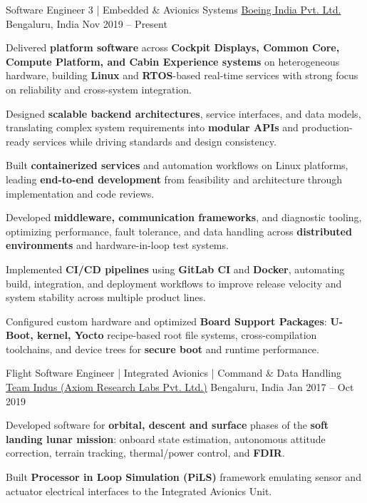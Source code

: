 \begin{cventries}
	\cventry
	{Software Engineer 3 | Embedded \& Avionics Systems}
	{\href{https://www.boeing.co.in/}{Boeing India Pvt. Ltd.}}
	{Bengaluru, India}
	{Nov 2019 -- Present}
	{
		\begin{cvitems}
		\item{Delivered \textbf{platform software} across \textbf{Cockpit Displays, Common Core, Compute Platform, and Cabin Experience systems} on heterogeneous hardware, building \textbf{Linux} and \textbf{RTOS}-based real-time services with strong focus on reliability and cross-system integration.}
		\vspace{8pt}
		\item{Designed \textbf{scalable backend architectures}, service interfaces, and data models, translating complex system requirements into \textbf{modular APIs} and production-ready services while driving standards and design consistency.}
		\vspace{8pt}
		\item{Built \textbf{containerized services} and automation workflows on Linux platforms, leading \textbf{end-to-end development} from feasibility and architecture through implementation and code reviews.}
		\vspace{8pt}
		\item{Developed \textbf{middleware, communication frameworks}, and diagnostic tooling, optimizing performance, fault tolerance, and data handling across \textbf{distributed environments} and hardware-in-loop test systems.}
		\vspace{8pt}
		\item{Implemented \textbf{CI/CD pipelines} using \textbf{GitLab CI} and \textbf{Docker}, automating build, integration, and deployment workflows to improve release velocity and system stability across multiple product lines.}
		\vspace{8pt}
		\item{Configured custom hardware and optimized \textbf{Board Support Packages}: \textbf{U-Boot, kernel, Yocto} recipe-based root file systems, cross-compilation toolchains, and device trees for \textbf{secure boot} and runtime performance.}
		\end{cvitems}
	}

	\cventry
	{Flight Software Engineer | Integrated Avionics | Command \& Data Handling}
	{\href{http://www.teamindus.in/}{Team Indus (Axiom Research Labs Pvt. Ltd.)}}
	{Bengaluru, India}
	{Jan 2017 -- Oct 2019}
	{
		\begin{cvitems}
		\item{Developed software for \textbf{orbital, descent and surface} phases of the \textbf{soft landing lunar mission}: onboard state estimation, autonomous attitude correction, terrain tracking, thermal/power control, and \textbf{FDIR}.}
		\vspace{8pt}
		\item{Built \textbf{Processor in Loop Simulation (PiLS)} framework emulating sensor and actuator electrical interfaces to the Integrated Avionics Unit.}
		\end{cvitems}
	}
\end{cventries}
